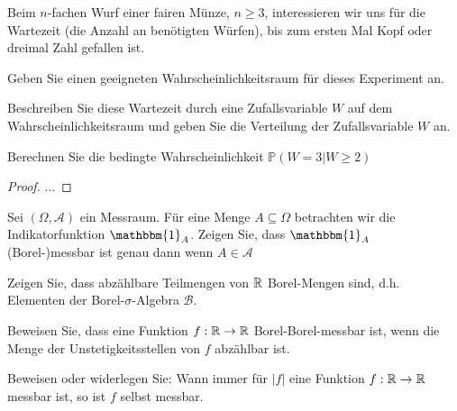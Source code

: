 \begin{Problem}
	Beim $n$-fachen Wurf einer fairen M\"{u}nze, $n \ge 3$, interessieren wir uns f\"{u}r die Wartezeit (die Anzahl an ben\"{o}tigten W\"{u}rfen), bis zum ersten Mal Kopf oder dreimal Zahl gefallen ist.
	\begin{parts}
		\item Geben Sie einen geeigneten Wahrscheinlichkeitsraum f\"{u}r dieses Experiment an.
		\item Beschreiben Sie diese Wartezeit durch eine Zufallsvariable $W$ auf dem Wahrscheinlichkeitsraum und geben Sie die Verteilung der Zufallsvariable $W$ an.
		\item Berechnen Sie die bedingte Wahrscheinlichkeit $\mathbb{P}(W=3|W\ge 2)$
	\end{parts}
\end{Problem}
\begin{proof}
	...
\end{proof}
\begin{Problem}
	\begin{parts}
		\item Sei $(\Omega, \mathcal{A})$ ein Messraum. F\"{u}r eine Menge $A\subseteq \Omega$ betrachten wir die Indikatorfunktion $\mathbbm{1}_A$. Zeigen Sie, dass $\mathbbm{1}_A$ (Borel-)messbar ist genau dann wenn $A\in \mathcal{A}$
		\item Zeigen Sie, dass abzählbare Teilmengen von $\mathbb{R}$ Borel-Mengen sind, d.h. Elementen der Borel-$\sigma$-Algebra $\mathcal{B}$.
		\item Beweisen Sie, dass eine Funktion $f:\mathbb{R} \to \mathbb{R}$ Borel-Borel-messbar ist, wenn die Menge der Unstetigkeitsstellen von $f$ abzählbar ist.
		\item Beweisen oder widerlegen Sie: Wann immer f\"{u}r $|f|$ eine Funktion $f:\mathbb{R}\to \mathbb{R}$ messbar ist, so ist $f$ selbst messbar.
	\end{parts}
\end{Problem}

